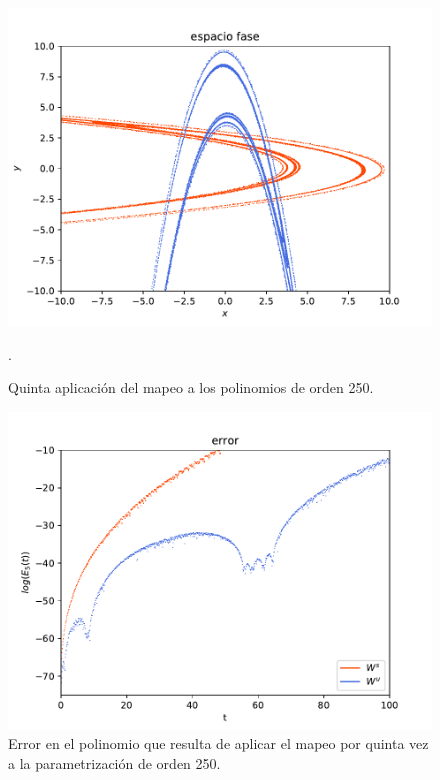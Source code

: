 \begin{figure}[H]
\centering
\includegraphics[scale=0.7]{rectangulo5.pdf}
\caption{Quinta aplicación del mapeo a los polinomios de orden 250.}.
\label{Rectangulo5}
\end{figure}

\begin{figure}[H]
\centering
\includegraphics[scale=0.7]{error5ite.pdf}
\caption{Error en el polinomio que resulta de aplicar el mapeo por quinta vez a la parametrización de orden 250.}
\label{error-5iteracion}
\end{figure}

